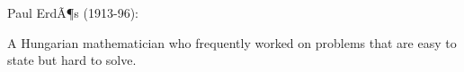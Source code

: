 Paul ErdÃ¶s (1913-96):

\par
A Hungarian mathematician who frequently worked
on problems that are easy to state but hard to solve.
